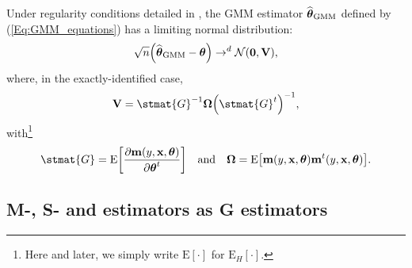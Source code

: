 Under regularity conditions detailed in \citet{Hansen:1982}, the GMM
estimator $\widehat{\boldsymbol{\theta}}_{\mathrm{GMM}}$ defined by
(\ref{Eq:GMM_equations}) has a limiting normal distribution: \
\begin{equation}
\sqrt{n}\left(  \sthat{\boldsymbol{\theta}}_{\mathrm{GMM}}%
-\boldsymbol{\theta}\right)  \rightarrow^{d}\mathcal{N}(\stvec{0}%
,\mathbf{V}), \label{Eq:GMM_estimator_normality}%
\end{equation}
where, in the exactly-identified case,
\begin{equation}
\mathbf{V}=\stmat{G}^{-1}\boldsymbol{\Omega}\left(  \stmat{G}^{t}\right)
^{-1}, \label{Eq:GMM_estimator_V}%
\end{equation}
with\footnote{Here and later, we simply write $\mathrm{E}\left[  \cdot\right]
$ for $\mathrm{E}_{H}\left[  \cdot\right]  $.}
\begin{equation}
\stmat{G}=\mathrm{E}\left[  \frac{\partial\mathbf{m}\left(  y,\stvec{x}%
,\boldsymbol{\theta}\right)  }{\partial\boldsymbol{\theta}^{t}}\right]
\quad\text{and}\quad\boldsymbol{\Omega}=\mathrm{E}\left[  \mathbf{m}\left(
y,\stvec{x},\boldsymbol{\theta}\right)  \mathbf{m}^{t}\left(  y,\stvec{x}%
,\boldsymbol{\theta}\right)  \right]  . \label{Eq:GMM_estimator_G_Omega}%
\end{equation}


\subsection{M-, S- and  estimators as G estimators}

